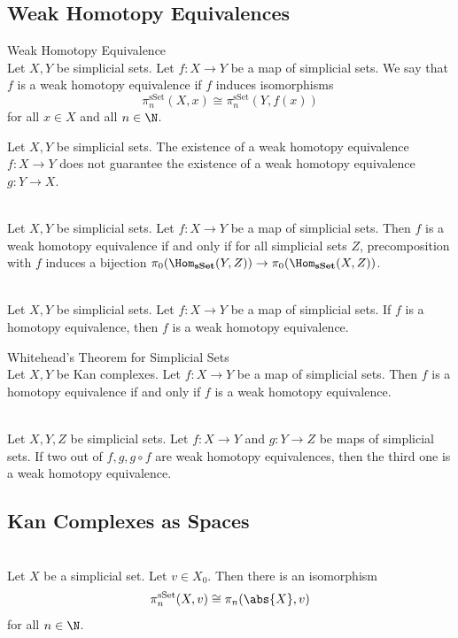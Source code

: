 \documentclass[a4paper]{article}
\begin{document}
\subsection{Weak Homotopy Equivalences}
\begin{defn}{Weak Homotopy Equivalence}{}\\
Let $X,Y$ be simplicial sets. Let $f:X\to Y$ be a map of simplicial sets. We say that $f$ is a weak homotopy equivalence if $f$ induces isomorphisms $$\pi_n^\text{sSet}(X,x)\cong\pi_n^\text{sSet}(Y,f(x))$$ for all $x\in X$ and all $n\in\N$. 
\end{defn}

Let $X,Y$ be simplicial sets. The existence of a weak homotopy equivalence $f:X\to Y$ does not guarantee the existence of a weak homotopy equivalence $g:Y\to X$. 

\begin{prp}{}{}\\
Let $X,Y$ be simplicial sets. Let $f:X\to Y$ be a map of simplicial sets. Then $f$ is a weak homotopy equivalence if and only if for all simplicial sets $Z$, precomposition with $f$ induces a bijection $\pi_0(\Hom_{\bold{sSet}}(Y,Z))\to\pi_0(\Hom_{\bold{sSet}}(X,Z))$. 
\end{prp}

\begin{lmm}{}{}\\
Let $X,Y$ be simplicial sets. Let $f:X\to Y$ be a map of simplicial sets. If $f$ is a homotopy equivalence, then $f$ is a weak homotopy equivalence. 
\end{lmm}

\begin{thm}{Whitehead's Theorem for Simplicial Sets}{}\\
Let $X,Y$ be Kan complexes. Let $f:X\to Y$ be a map of simplicial sets. Then $f$ is a homotopy equivalence if and only if $f$ is a weak homotopy equivalence. 
\end{thm}

\begin{lmm}{}{}\\
Let $X,Y,Z$ be simplicial sets. Let $f:X\to Y$ and $g:Y\to Z$ be maps of simplicial sets. If two out of $f,g,g\circ f$ are weak homotopy equivalences, then the third one is a weak homotopy equivalence. 
\end{lmm}

\subsection{Kan Complexes as Spaces}
\begin{prp}{}{}\\
Let $X$ be a simplicial set. Let $v\in X_0$. Then there is an isomorphism $$\pi_n^\text{sSet}(X,v)\cong\pi_n(\abs{X},v)$$ for all $n\in\N$. 
\end{prp}
\end{document}
